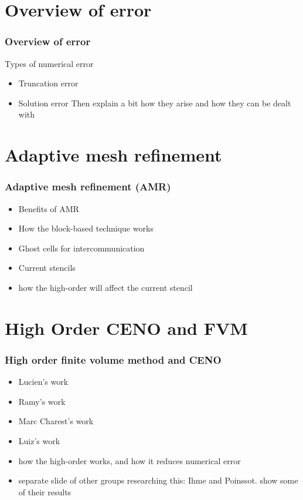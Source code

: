 \documentclass{beamer}
\begin{document}


\section[Error]{Overview of error}
\begin{frame}[allowframebreaks]
\frametitle{Overview of error}
Types of numerical error
\begin{itemize}
\item Truncation error
\item Solution error
Then explain a bit how they arise and how they can be dealt with
\end{itemize}
\end{frame}



\section[AMR]{Adaptive mesh refinement}
\begin{frame}[allowframebreaks]
\frametitle{Adaptive mesh refinement (AMR)}
\begin{itemize}
\item Benefits of AMR
\item How the block-based technique works
\item Ghost cells for intercommunication
\item Current stencils
\item how the high-order will affect the current stencil
\end{itemize}
\end{frame}






\section[FVM]{High Order CENO and FVM}
\begin{frame}[allowframebreaks]
\frametitle{High order finite volume method and CENO}
\begin{itemize}
\item Lucien's work
\item Ramy's work
\item Marc Charest's work
\item Luiz's work
\item how the high-order works, and how it reduces numerical error
\item separate slide of other groups researching this: Ihme and Poinssot. show some of their results
\end{itemize}
\end{frame}
\end{document}

